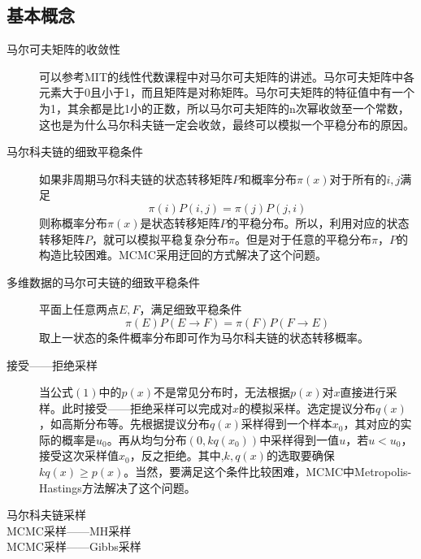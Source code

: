 \documentclass{ctexart}
\begin{document}
\subsection{基本概念}
\label{concepts}
\begin{description}
\item[马尔可夫矩阵的收敛性]
可以参考MIT的线性代数课程中对马尔可夫矩阵的讲述。马尔可夫矩阵中各元素大于0且小于1，而且矩阵是对称矩阵。马尔可夫矩阵的特征值中有一个为1，其余都是比1小的正数，所以马尔可夫矩阵的n次幂收敛至一个常数，这也是为什么马尔科夫链一定会收敛，最终可以模拟一个平稳分布的原因。

\item[马尔科夫链的细致平稳条件]
如果非周期马尔科夫链的状态转移矩阵$P$和概率分布$\pi\left(x\right)$对于所有的$i,j$满足
\begin{equation}
\pi\left(i\right)P\left(i,j\right)=\pi\left(j\right)P\left(j,i\right)
\end{equation}
则称概率分布$\pi\left(x\right)$是状态转移矩阵$P$的平稳分布。所以，利用对应的状态转移矩阵$P$，就可以模拟平稳复杂分布$\pi$。但是对于任意的平稳分布$\pi$，$P$的构造比较困难。MCMC采用迂回的方式解决了这个问题。

\item[多维数据的马尔可夫链的细致平稳条件]

平面上任意两点$E,F$，满足细致平稳条件
\begin{equation}
\pi\left(E\right)P\left(E\to F\right)=\pi\left(F\right)P\left(F\to E\right)
\end{equation}
取上一状态的条件概率分布即可作为马尔科夫链的状态转移概率。

\item[接受——拒绝采样]

当公式$\left(1\right)$中的$p\left(x\right)$不是常见分布时，无法根据$p\left(x\right)$对$x$直接进行采样。此时接受——拒绝采样可以完成对$x$的模拟采样。选定提议分布$q\left(x\right)$，如高斯分布等。先根据提议分布$q\left(x\right)$采样得到一个样本$x_0$，其对应的实际的概率是$u_0$。再从均匀分布$\left(0,kq\left(x_0\right)\right)$中采样得到一值$u$，若$u<u_0$，接受这次采样值$x_0$，反之拒绝。其中,$k,q\left(x\right)$的选取要确保$kq\left(x\right)\ge p\left(x\right)$。当然，要满足这个条件比较困难，MCMC中Metropolis-Hastings方法解决了这个问题。


\item[马尔科夫链采样]

\item[MCMC采样——MH采样]

\item[MCMC采样——Gibbs采样]



\end{description}
\end{document}
